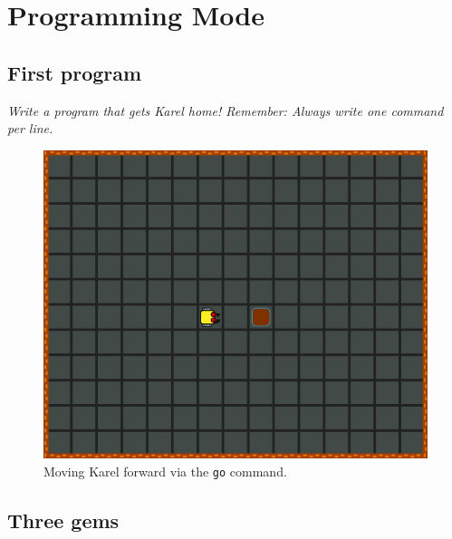 
\section{Programming Mode}



\subsection{First program}

{\em Write a program that gets Karel home! Remember: Always write one command per line.}

\begin{figure}[!ht]
\begin{center}
\includegraphics[height=0.4\textwidth]{img/b01.png}
\end{center}
\vspace{-4mm}
\caption{Moving Karel forward via the {\tt go} command.}
\label{fig:b01}
\vspace{-4mm}
\end{figure}
\noindent



\subsection{Three gems}

